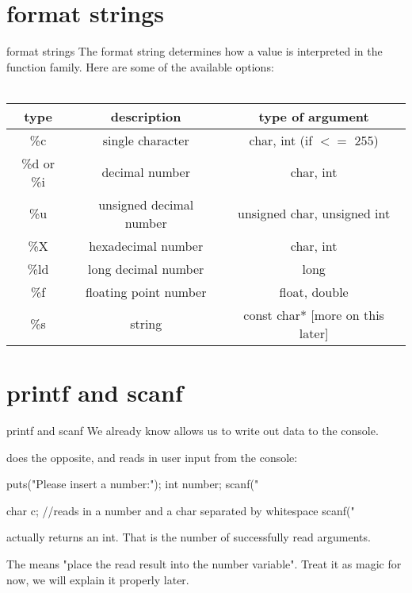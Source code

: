 \documentclass[10pt,graphics,aspectratio=169,table]{beamer}
\begin{document}
\section{format strings}
\begin{frame}{format strings}
    The format string determines how a value is interpreted in the  
    function family. Here are some of the available options: \\ \ \\
    \begin{tabular}{|c|c|c|}
        \hline
        \textbf{type} & \textbf{description} & \textbf{type of argument} \\\hline
        \%c & single character & char, int (if $<=$ 255) \\\hline
        \%d or \%i & decimal number & char, int \\\hline
        \%u & unsigned decimal number & unsigned char, unsigned int \\\hline
        \%X & hexadecimal number & char, int \\\hline
        \%ld & long decimal number & long \\\hline
        \%f & floating point number & float, double \\\hline
        \%s & string & const char* [more on this later] \\\hline
    \end{tabular}
\end{frame}

\section{printf and scanf}
\begin{frame}[fragile]{printf and scanf}
    We already know  allows us to write out data to the console.

     does the opposite, and reads in user input from the console:
    \begin{codeblock}
puts("Please insert a number:");
int number;
scanf("%

char c;
//reads in a number and a char separated by whitespace
scanf("%
    \end{codeblock}

     actually returns an int. That is the number of successfully
    read arguments.

    The  means "place the read result into the number variable".
    Treat it as magic for now, we will explain it properly later.
\end{frame}
\end{document}
